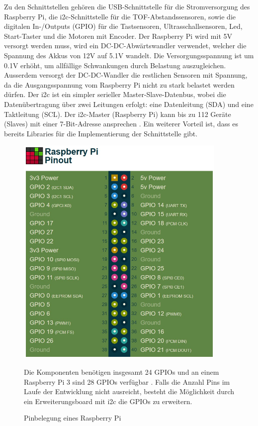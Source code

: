 Zu den Schnittstellen gehören die USB-Schnittstelle für die Stromversorgung des Raspberry Pi, die \acrshort{i2c}-Schnittstelle für die TOF-Abstandssensoren, sowie die digitalen In-/Outputs (GPIO) für die Tastsensoren, Ultrasschallsensoren, Led, Start-Taster und die Motoren mit Encoder. Der Raspberry Pi wird mit 5V versorgt werden muss, wird ein DC-DC-Abwärtswandler verwendet, welcher die Spannung des Akkus von 12V auf 5.1V wandelt. Die Versorgungsspannung ist um 0.1V erhöht, um allfällige Schwankungen durch Belastung auszugleichen. Ausserdem versorgt der DC-DC-Wandler die restlichen Sensoren mit Spannung, da die Ausgangsspannung vom Raspberry Pi nicht zu stark belastet werden dürfen.
Der \acrshort{i2c} ist ein simpler serieller Master-Slave-Datenbus, wobei die Datenübertragung über zwei Leitungen erfolgt: eine Datenleitung (SDA) und eine Taktleitung (SCL). Der \acrshort{i2c}-Master (Raspberry Pi) kann bis zu 112 Geräte (Slaves) mit einer 7-Bit-Adresse ansprechen \cite{I2C}. Ein weiterer Vorteil ist, dass es bereits Libraries für die Implementierung der Schnittstelle gibt.

\newpage
\begin{figure}[ht]
 \begin{minipage}{0.5\textwidth}
 \includegraphics[width=0.9\textwidth]{img/Funktionsmuster Treppensteigen/Pinout.png}
 \caption{Pinbelegung eines Raspberry Pi}
 \end{minipage} 
	\hfill
	\begin{minipage}{0.5\textwidth}
 Die Komponenten benötigen insgesamt 24 GPIOs und an einem Raspberry Pi 3 sind 28 GPIOs verfügbar \footnotemark. Falls die Anzahl Pins im Laufe der Entwicklung nicht ausreicht, besteht die Möglichkeit durch ein Erweiterungsboard mit \acrshort{i2c} die GPIOs zu erweitern.
 \vspace{5cm}
 \end{minipage}
\end{figure}

